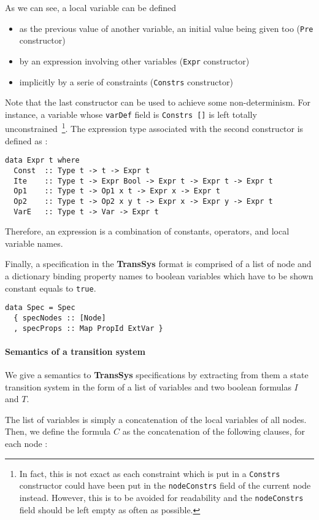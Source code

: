 As we can see, a local variable can be defined
\begin{itemize}
\item as the previous value of another variable, an initial value being given too (\texttt{Pre} constructor)
\item by an expression involving other variables (\texttt{Expr} constructor)
\item implicitly by a serie of constraints (\texttt{Constrs} constructor)
\end{itemize}
Note that the last constructor can be used to achieve some non-determinism. For instance, a variable whose \texttt{varDef} field is \texttt{Constrs []} is left totally unconstrained~\footnote{In fact, this is not exact as each constraint which is put in a \texttt{Constrs} constructor could have been put in the \texttt{nodeConstrs} field of the current node instead. However, this is to be avoided for readability and the \texttt{nodeConstrs} field should be left empty as often as possible.
}. The expression type associated with the second constructor is defined as :
\begin{lstlisting}[frame=single]
data Expr t where
  Const  :: Type t -> t -> Expr t
  Ite    :: Type t -> Expr Bool -> Expr t -> Expr t -> Expr t
  Op1    :: Type t -> Op1 x t -> Expr x -> Expr t
  Op2    :: Type t -> Op2 x y t -> Expr x -> Expr y -> Expr t
  VarE   :: Type t -> Var -> Expr t
\end{lstlisting}
Therefore, an expression is a combination of constants, operators, and local variable names.


Finally, a specification in the \textbf{TransSys} format is comprised
of  a list of node and a dictionary binding property names to boolean variables which have to be shown constant equals to \texttt{true}.
\begin{lstlisting}[frame=single]
data Spec = Spec
  { specNodes :: [Node]
  , specProps :: Map PropId ExtVar }
\end{lstlisting}


\paragraph{Semantics of a transition system}
We give a semantics to \textbf{TransSys} specifications by extracting from them a state transition system in the form of a list of variables and two boolean formulas $I$ and $T$. 

The list of variables is simply a concatenation of the local variables of all nodes. Then, we define the formula $C$ as the concatenation of the following clauses, for each node :


